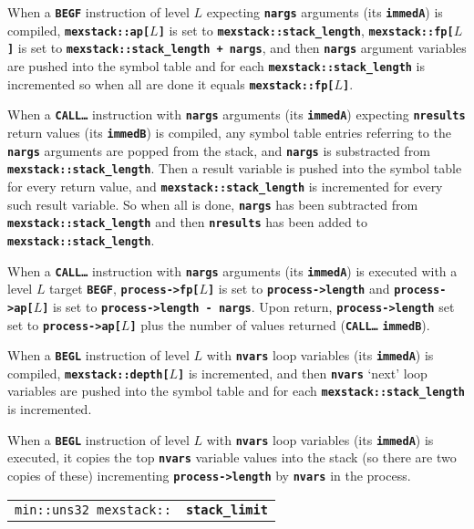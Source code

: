 \documentclass[12pt]{article}
\makeatletter
\newcommand{\TT}[1]{{\tt \bfseries #1}}
\newcommand{\ttindex}[1]{\index{#1@{\tt #1}}}
\newcommand{\EOL}{\penalty \exhyphenpenalty}
\newenvironment{indpar}[1][0.3in]%
	{\begin{list}{}%
		     {\setlength{\itemsep}{0in}%
		      \setlength{\topsep}{0in}%
		      \setlength{\parsep}{1ex}%
		      \setlength{\labelwidth}{#1}%
		      \setlength{\leftmargin}{#1}%
		      \addtolength{\leftmargin}{\labelsep}}%
	 \item}%
	{\end{list}}
\newcommand{\MEXSTACKKEY}[1]%
	   {\TT{#1}\ttindex{mexstack::#1}\ttindex{#1}}
\makeatother
\begin{document}
\begin{indpar}
When a \TT{BEGF} instruction of level $L$ expecting \TT{nargs} arguments
(its \TT{immedA}) is compiled, \TT{mexstack::ap[$L$]}
is set to \TT{mexstack::stack\_length}, \TT{mexstack::fp[$L$]} is set
to \TT{mexstack::stack\_length + nargs}, and then \TT{nargs} argument
variables are pushed into the symbol table and for each
\TT{mexstack::stack\_length} is incremented so when all are done it equals
\TT{mexstack::fp[$L$]}.

When a \TT{CALL\ldots} instruction with \TT{nargs} arguments
(its \TT{immedA}) expecting \TT{nresults} return values (its \TT{immedB}) is compiled,
any symbol table entries referring to the \TT{nargs} arguments
are popped from the stack, and \TT{nargs} is substracted from
\TT{mexstack::\EOL stack\_\EOL length}.  Then a result variable is pushed into the
symbol table for every return value, and \TT{mexstack::\EOL stack\_\EOL length}
is incremented for every such result variable.
So when all is done, \TT{nargs} has been subtracted from \TT{mexstack::stack\_length}
and then \TT{nresults} has been added to \TT{mexstack::stack\_length}.

When a \TT{CALL\ldots} instruction with \TT{nargs} arguments
(its \TT{immedA}) is executed with a level $L$ target \TT{BEGF},
\TT{process->fp[$L$]} is set to \TT{process->length} and
\TT{process->ap[$L$]} is set to \TT{process->length - nargs}.
Upon return, \TT{process->length} set set to \TT{process->ap[$L$]}
plus the number of values returned (\TT{CALL\ldots} \TT{immedB}).

When a \TT{BEGL} instruction of level $L$ with \TT{nvars} loop
variables (its \TT{immedA}) is compiled, \TT{mexstack::depth[$L$]}
is incremented, and then
\TT{nvars} `next' loop variables are
pushed into the symbol table and for each
\TT{mexstack::stack\_length} is incremented.

When a \TT{BEGL} instruction of level $L$ with \TT{nvars} loop
variables (its \TT{immedA}) is executed, it copies the top
\TT{nvars} variable values into the stack (so there are two copies
of these) incrementing \TT{process->length} by \TT{nvars} in the
process.

\end{indpar}

\begin{tabular}{@{}r@{~~~}l}
\verb|min::uns32 mexstack::| & \MEXSTACKKEY{stack\_limit} \\
\end{tabular}
\end{document}
